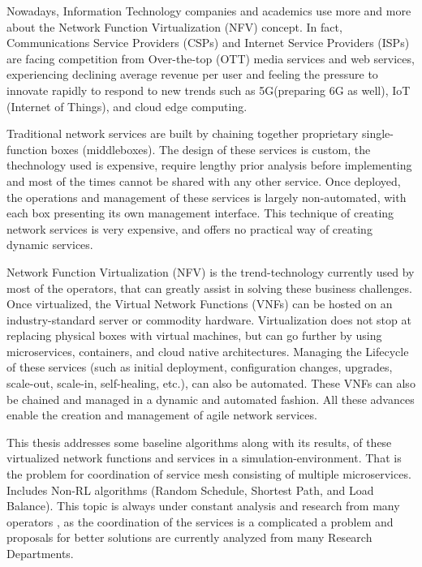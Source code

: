 Nowadays, Information Technology companies and academics use more and
more about the Network Function Virtualization (NFV) concept. In fact, Communications
Service Providers (CSPs) and Internet Service Providers (ISPs) are facing competition from
Over-the-top (OTT) media services and web services, experiencing declining average revenue per user and feeling the pressure to innovate rapidly to respond to new trends
such as 5G(preparing 6G as well), IoT (Internet of Things), and cloud edge computing.

Traditional network services are built by chaining together proprietary single-function boxes
(middleboxes). The design of these services is custom, the thechnology used is expensive, require lengthy prior analysis before implementing and most of the times cannot be shared with any other service.
Once deployed, the operations and management of these services is largely non-automated,
with each box presenting its own management interface. This technique of creating network
services is very expensive, and offers no practical way of creating dynamic services.

Network Function Virtualization (NFV) is the trend-technology currently used by most of the operators, that can greatly assist in solving
these business challenges. Once virtualized, the Virtual Network Functions (VNFs) can
be hosted on an industry-standard server or commodity hardware. Virtualization does not
stop at replacing physical boxes with virtual machines, but can go further by using microservices, containers, and cloud native architectures. Managing the Lifecycle of these
services (such as initial deployment, configuration changes, upgrades, scale-out, scale-in,
self-healing, etc.), can also be automated. These VNFs can also be chained and managed in a dynamic and automated fashion. All these advances enable the creation and management
of agile network services.

This thesis addresses some baseline algorithms along with its results,
 of these virtualized network functions and services in a simulation-environment. That is the problem for coordination of service mesh consisting of
  multiple microservices. Includes Non-RL algorithms (Random Schedule,
Shortest Path, and Load Balance). This topic is always under
constant analysis and research  
from many operators , as the coordination of the services is a complicated
a problem and proposals for better solutions are currently
analyzed from many Research Departments.